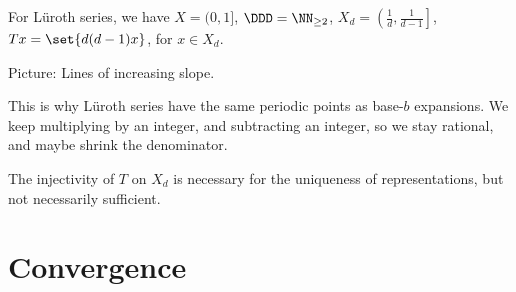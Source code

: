 \documentclass{article}
\begin{document}
\begin{example}
    For L\"uroth series, we have
    $X=(0,1]$, $\DDD = \NN_{\ge 2}$,
    $X_d = \left(\frac{1}{d},\frac{1}{d-1}\right]$,
    $Tx = \set{d(d-1)x}$, for $x\in X_d$.

    Picture: Lines of increasing slope.

    This is why L\"uroth series have the same periodic points
    as base-$b$ expansions. We keep multiplying by an integer,
    and subtracting an integer, so we stay rational, and
    maybe shrink the denominator.
\end{example}

The injectivity of $T$ on $X_d$ is necessary for the
uniqueness of representations, but not necessarily sufficient.

\section{Convergence}
\end{document}
